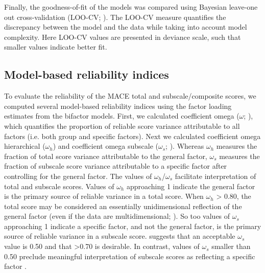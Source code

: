 \documentclass[letterpaper,man,natbib,floatsintext,longtable]{apa6}
\begin{document}
Finally, the goodness-of-fit of the models was compared using Bayesian leave-one out cross-validation (LOO-CV; \citealt{vehtari2017practical}). The LOO-CV measure quantifies the discrepancy between the model and the data while taking into account model complexity. Here LOO-CV values are presented in deviance scale, such that smaller values indicate better fit.

\subsection{Model-based reliability indices}

To evaluate the reliability of the MACE total and subscale/composite scores, we computed several model-based reliability indices using the factor loading estimates from the bifactor models. First, we calculated coefficient omega ($\omega$; \citealt{mcdonald1999test}), which quantifies the proportion of reliable score variance attributable to all factors (i.e. both group and specific factors). Next we calculated coefficient omega hierarchical ($\omega_h$) and coefficient omega subscale ($\omega_s$;  \citealt{reise2013applying, rodriguez2016evaluating}). Whereas $\omega_h$ measures the fraction of total score variance attributable to the general factor, $\omega_s$ measures the fraction of subscale score variance attributable to a specific factor after controlling for the general factor. The values of $\omega_h$/$\omega_s$ facilitate interpretation of total and subscale scores. Values of $\omega_h$ approaching 1 indicate the general factor is the primary source of reliable variance in a total score. When $\omega_h$ > 0.80, the total score may be considered an essentially unidimensional reflection of the general factor (even if the data are multidimensional;  \citealt{rodriguez2016applying}). So too values of $\omega_s$ approaching 1 indicate a specific factor, and not the general factor, is the primary source of reliable variance in a subscale score. \cite{canivez2016bifactor} suggests that an acceptable $\omega_s$ value is 0.50 and that >0.70 is desirable. In contrast, values of $\omega_s$ smaller than 0.50 preclude meaningful interpretation of subscale scores as reflecting a specific factor \citep{gignac2013bifactor}. 
\end{document}
